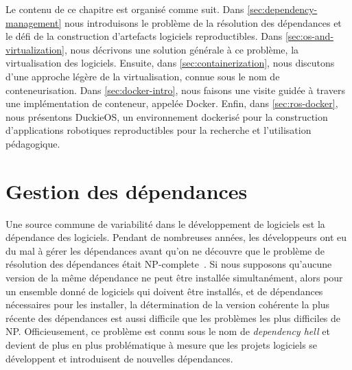 Le contenu de ce chapitre est organisé comme suit. Dans \autoref{sec:dependency-management} nous introduisons le problème de la résolution des dépendances et le défi de la construction d'artefacts logiciels reproductibles. Dans \autoref{sec:os-and-virtualization}, nous décrivons une solution générale à ce problème, la virtualisation des logiciels. Ensuite, dans \autoref{sec:containerization}, nous discutons d'une approche légère de la virtualisation, connue sous le nom de conteneurisation. Dans \autoref{sec:docker-intro}, nous faisons une visite guidée à travers une implémentation de conteneur, appelée Docker. Enfin, dans \autoref{sec:ros-docker}, nous présentons DuckieOS, un environnement dockerisé pour la construction d'applications robotiques reproductibles pour la recherche et l'utilisation pédagogique.

\section{Gestion des dépendances}\label{sec:dependency-management}

Une source commune de variabilité dans le développement de logiciels est la dépendance des logiciels. Pendant de nombreuses années, les développeurs ont eu du mal à gérer les dépendances avant qu'on ne découvre que le problème de résolution des dépendances était NP-complete~\citep{abate2012dependency}. Si nous supposons qu'aucune version de la même dépendance ne peut être installée simultanément, alors pour un ensemble donné de logiciels qui doivent être installés, et de dépendances nécessaires pour les installer, la détermination de la version cohérente la plus récente des dépendances est aussi difficile que les problèmes les plus difficiles de NP. Officieusement, ce problème est connu sous le nom de \textit{dependency hell} et devient de plus en plus problématique à mesure que les projets logiciels se développent et introduisent de nouvelles dépendances.

